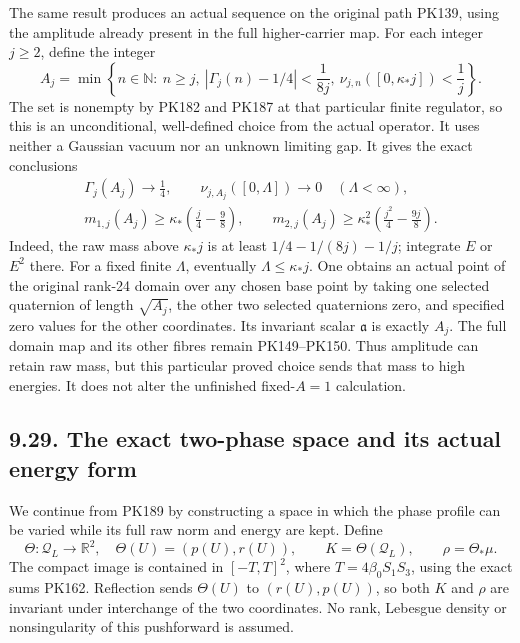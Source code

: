 \documentclass[11pt]{article}
\begin{document}
The same result produces an actual sequence on the original path
PK139, using the amplitude already present in the full higher-carrier
map. For each integer \(j\ge2\), define the integer
\[
 A_j=\min\left\{n\in\mathbb N:\ n\ge j,\
       |\Gamma_j(n)-1/4|<\frac1{8j},\
       \nu_{j,n}([0,\kappa_*j])<\frac1j\right\}.
 \tag{PK188}
\]
The set is nonempty by PK182 and PK187 at that particular finite
regulator, so this is an unconditional, well-defined choice from
the actual operator. It uses neither a Gaussian vacuum nor an
unknown limiting gap. It gives the exact conclusions
\[
 \begin{gathered}
 \Gamma_j(A_j)\longrightarrow\frac14,\qquad
 \nu_{j,A_j}([0,\Lambda])\longrightarrow0
                         \quad(\Lambda<\infty),\\
 m_{1,j}(A_j)\ge
       \kappa_*\left(\frac j4-\frac98\right),\qquad
 m_{2,j}(A_j)\ge
       \kappa_*^2\left(\frac{j^2}{4}-\frac{9j}{8}\right).
 \end{gathered}\tag{PK189}
\]
Indeed, the raw mass above \(\kappa_*j\) is at least
\(1/4-1/(8j)-1/j\); integrate \(E\) or \(E^2\) there.
For a fixed finite \(\Lambda\), eventually \(\Lambda\le\kappa_*j\).
One obtains an actual point of the original rank-24 domain over
any chosen base point by taking one selected quaternion of length
\(\sqrt{A_j}\), the other two selected quaternions zero, and
specified zero values for the other coordinates. Its invariant
scalar \(\mathfrak a\) is exactly \(A_j\). The full domain map and
its other fibres remain PK149–PK150.
Thus amplitude can retain raw mass, but this particular proved
choice sends that mass to high energies. It does not alter the
unfinished fixed-\(A=1\) calculation.

\subsection*{9.29. The exact two-phase space and its actual energy form}

We continue from PK189 by constructing a space in which the phase
profile can be varied while its full raw norm and energy are kept.
Define
\[
 \Theta:\mathcal Q_L\longrightarrow\mathbb R^2,\quad
 \Theta(U)=(p(U),r(U)),\qquad
 K=\Theta(\mathcal Q_L),\qquad \rho=\Theta_*\mu .
 \tag{PK190}
\]
The compact image is contained in \([-T,T]^2\), where
\(T=4\beta_0S_1S_3\), using the exact sums PK162.
Reflection sends \(\Theta(U)\) to \((r(U),p(U))\), so both
\(K\) and \(\rho\) are invariant under interchange of the two
coordinates. No rank, Lebesgue density or nonsingularity of this
pushforward is assumed.
\end{document}
